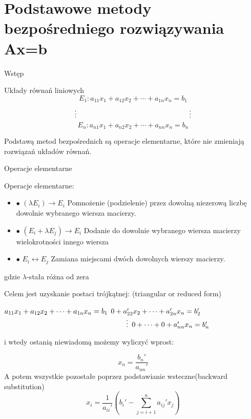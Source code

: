 \section{Podstawowe metody bezpośredniego rozwiązywania Ax=b}
\begin{frame}{Wstęp}
\begin{block}{Układy równań liniowych}
$$
E_{1}:a_{11}x_{1}+a_{12}x_{2}+\cdots+a_{1n}x_{n}=b_{1}
$$
$$
\vdots \hspace{55.5mm} \vdots
$$
$$
E_{n}:a_{n1}x_{1}+a_{n2}x_{2}+\cdots+a_{nn}x_{n}=b_{n}
$$
\end{block}
Podstawą metod bezpośrednich  są operacje elementarne, które nie zmieniają rozwiązań układów równań.


\end{frame}
\begin{frame}{Operacje elementarne}

Operacje elementarne: \newline
\begin{itemize}
    \item $\bullet$  $(\lambda E_{i})\rightarrow E_{i}$ Pomnożenie (podzielenie) przez dowolną niezerową liczbę dowolnie wybranego wiersza macierzy.  
\item $\bullet$ $(E_{i}+\lambda E_{j})\rightarrow E_{i}$ Dodanie do dowolnie wybranego wiersza macierzy wielokrotności innego wiersza  

\item $\bullet$ $E_{i}\leftrightarrow E_{j}$ 
Zamiana miejscami dwóch dowolnych wierszy macierzy. 
\end{itemize}
\newline
gdzie $\lambda$-stała różna od zera \newline
\end{frame}
\begin{frame}
Celem jest uzyskanie postaci trójkątnej: (triangular or reduced form)
\begin{flushright}
$a_{11}x_{1}+a_{12}x_{2}+\cdots+a_{1n}x_{n}=b_{1} \linebreak$
$0+a_{22}'x_{2}+\cdots+a_{2n}'x_{n}=b_{2}'
 \linebreak$
$ \hspace{60mm} \vdots \linebreak$
$0+\cdots+0+a_{nn}'x_{n}=b_{n}' \linebreak$
\end{flushright}
i wtedy ostanią niewiadomą możemy wyliczyć wprost:

$$ x_{n}=  \frac{b_{n}'}{a_{nn}'}$$
 A potem wszystkie pozostałe poprzez podstawianie wsteczne(backward substitution)
$$x_{i}= \frac{1}{a_{ii}'}(b_{i}'-\displaystyle \sum_{j=i+1}^{n} a_{ij}'x_{j})$$ 
\end{frame}
